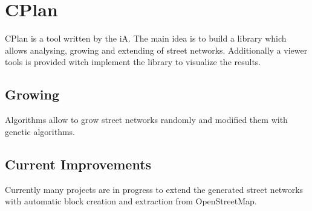 \section{CPlan}
\label{CPlan}
CPlan is a tool written by the \acrlong{iA}. The main idea is to build a library which allows analysing, growing and extending of street networks. Additionally a viewer tools is provided witch implement the library to visualize the results. \citep{cPlan:2015}

\subsection{Growing}
Algorithms allow to grow street networks randomly and modified them with genetic algorithms.

\subsection{Current Improvements}
Currently many projects are in progress to extend the generated street networks with automatic block creation and extraction from OpenStreetMap.
